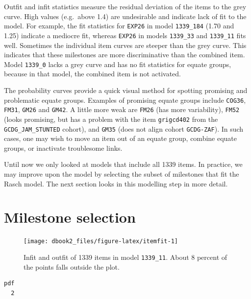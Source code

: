 \documentclass[
]{book}
\begin{document}
Outfit and infit statistics measure the residual deviation of the items to the grey curve. High values (e.g.~above 1.4) are undesirable and indicate lack of fit to the model. For example, the fit statistics for \texttt{EXP26} in model \texttt{1339\_184} (1.70 and 1.25) indicate a mediocre fit, whereas \texttt{EXP26} in models \texttt{1339\_33} and \texttt{1339\_11} fits well. Sometimes the individual item curves are steeper than the grey curve. This indicates that these milestones are more discriminative than the combined item. Model \texttt{1339\_0} lacks a grey curve and has no fit statistics for equate groups, because in that model, the combined item is not activated.

The probability curves provide a quick visual method for spotting promising and problematic equate groups. Examples of promising equate groups include \texttt{COG36}, \texttt{FM31}, \texttt{GM26} and \texttt{GM42}. A little more weak are \texttt{FM26} (has more variability), \texttt{FM52} (looks promising, but has a problem with the item \texttt{grigcd402} from the \texttt{GCDG\_JAM\_STUNTED} cohort), and \texttt{GM35} (does not align cohort \texttt{GCDG-ZAF}). In such cases, one may wish to move an item out of an equate group, combine equate groups, or inactivate troublesome links.

Until now we only looked at models that include all 1339 items. In practice, we may improve upon the model by selecting the subset of milestones that fit the Rasch model. The next section looks in this modelling step in more detail.

\hypertarget{sec:milestoneselection}{%
\section{Milestone selection}\label{sec:milestoneselection}}

\begin{figure}

{\centering \texttt{[image: dbook2\_files/figure-latex/itemfit-1]} 

}

\caption{Infit and outfit of 1339 items in model \texttt{1339\_11}. About 8 percent of the points falls outside the plot.}\label{fig:itemfit}
\end{figure}

\begin{verbatim}
pdf 
  2 
\end{verbatim}
\end{document}
